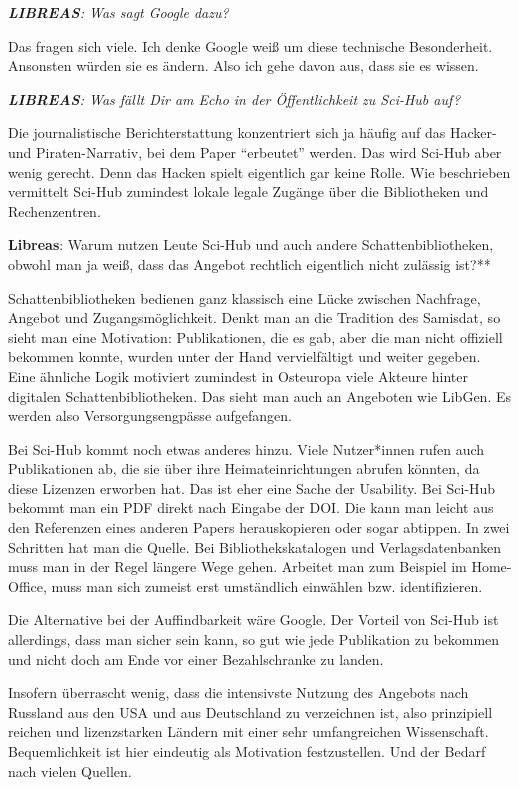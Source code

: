 \documentclass[a4paper,
fontsize=11pt,
oneside,
numbers=noperiodatend,
parskip=half-,
bibliography=totoc,
final
]{scrartcl}
\begin{document}
\emph{\textbf{LIBREAS}: Was sagt Google dazu?}

Das fragen sich viele. Ich denke Google weiß um diese technische
Besonderheit. Ansonsten würden sie es ändern. Also ich gehe davon aus,
dass sie es wissen.

\emph{\textbf{LIBREAS}: Was fällt Dir am Echo in der Öffentlichkeit zu
Sci-Hub auf?}

Die journalistische Berichterstattung konzentriert sich ja häufig auf
das Hacker- und Piraten-Narrativ, bei dem Paper \enquote{erbeutet}
werden. Das wird Sci-Hub aber wenig gerecht. Denn das Hacken spielt
eigentlich gar keine Rolle. Wie beschrieben vermittelt Sci-Hub zumindest
lokale legale Zugänge über die Bibliotheken und Rechenzentren.

\textbf{Libreas}: Warum nutzen Leute Sci-Hub und auch andere
Schattenbibliotheken, obwohl man ja weiß, dass das Angebot rechtlich
eigentlich nicht zulässig ist?**

Schattenbibliotheken bedienen ganz klassisch eine Lücke zwischen
Nachfrage, Angebot und Zugangsmöglichkeit. Denkt man an die Tradition
des Samisdat, so sieht man eine Motivation: Publikationen, die es gab,
aber die man nicht offiziell bekommen konnte, wurden unter der Hand
vervielfältigt und weiter gegeben. Eine ähnliche Logik motiviert
zumindest in Osteuropa viele Akteure hinter digitalen
Schattenbibliotheken. Das sieht man auch an Angeboten wie LibGen. Es
werden also Versorgungsengpässe aufgefangen.

Bei Sci-Hub kommt noch etwas anderes hinzu. Viele Nutzer*innen rufen
auch Publikationen ab, die sie über ihre Heimateinrichtungen abrufen
könnten, da diese Lizenzen erworben hat. Das ist eher eine Sache der
Usability. Bei Sci-Hub bekommt man ein PDF direkt nach Eingabe der DOI.
Die kann man leicht aus den Referenzen eines anderen Papers
herauskopieren oder sogar abtippen. In zwei Schritten hat man die
Quelle. Bei Bibliothekskatalogen und Verlagsdatenbanken muss man in der
Regel längere Wege gehen. Arbeitet man zum Beispiel im Home-Office, muss
man sich zumeist erst umständlich einwählen bzw. identifizieren.

Die Alternative bei der Auffindbarkeit wäre Google. Der Vorteil von
Sci-Hub ist allerdings, dass man sicher sein kann, so gut wie jede
Publikation zu bekommen und nicht doch am Ende vor einer Bezahlschranke
zu landen.

Insofern überrascht wenig, dass die intensivste Nutzung des Angebots
nach Russland aus den USA und aus Deutschland zu verzeichnen ist, also
prinzipiell reichen und lizenzstarken Ländern mit einer sehr
umfangreichen Wissenschaft. Bequemlichkeit ist hier eindeutig als
Motivation festzustellen. Und der Bedarf nach vielen Quellen.
\end{document}
